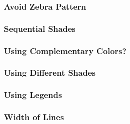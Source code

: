 \documentclass[12pt]{beamer}\usepackage[]{graphicx}\usepackage[]{color}
\begin{document}
\begin{frame}
\frametitle{Avoid Zebra Pattern}
\begin{center}
\end{center}
\end{frame}


\begin{frame}
\frametitle{Sequential Shades}
\begin{center}
\end{center}
\end{frame}


\begin{frame}
\frametitle{Using Complementary Colors?}
\begin{center}
\end{center}
\end{frame}


\begin{frame}
\frametitle{Using Different Shades}
\begin{center}
\end{center}
\end{frame}


\begin{frame}
\frametitle{Using Legends}
\begin{center}
\end{center}
\end{frame}


\begin{frame}
\begin{center}
\Huge{}
\end{center}
\end{frame}


\begin{frame}
\frametitle{Width of Lines}
\begin{center}
\end{center}
\end{frame}
\end{document}
